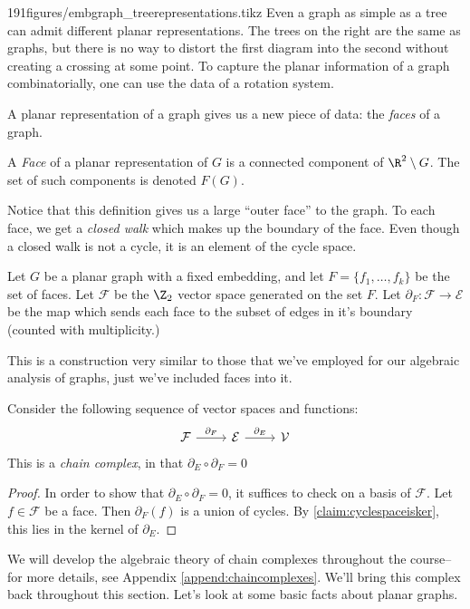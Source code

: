 \begin{examplefigureenv}{191figures/embgraph_treerepresentations.tikz}	Even a graph as simple as a tree can admit different planar representations. The trees on the right are the same as graphs, but there is no way to distort the first diagram into the second without creating a crossing at some point. To capture the planar information of a graph combinatorially, one can use the data of a rotation system.
\end{examplefigureenv}
A planar representation of a graph gives us a new piece of data: the \emph{faces} of a graph. 
\begin{definition} A \emph{Face} of a planar representation of $G$ is a connected component of $\R^2\setminus G$.  The set of such components is denoted $F(G)$. 
\end{definition}
 Notice that this definition gives us a large ``outer face'' to the graph. To each face, we get a \emph{closed walk} which makes up the boundary of the face. Even though a closed walk is not a cycle, it is an element of the cycle space. 
\begin{definition} Let $G$ be a planar graph with a fixed embedding, and let $F=\{f_1, \ldots, f_k\}$ be the set of faces. Let $\mathcal F$ be the $\Z_2$ vector space generated on the set $F$. Let $\partial_F: \mathcal F\to \mathcal E$ be the map which sends each face to the subset of edges in it's boundary (counted with multiplicity.) 
 \end{definition}
This is a construction very similar to those that we've employed for our algebraic analysis of graphs, just we've included faces into it. 
\begin{claim}
Consider the following sequence of vector spaces and functions:
\[ \begin{tikzcd}
\mathcal F \arrow{r}{\partial_F} & \mathcal E \arrow{r}{\partial_E} & \mathcal V
\end{tikzcd}\]
This is a \emph{chain complex}, in that $\partial_E\circ \partial_F =0$ \label{def:planarcomplex}
\label{claim:dsquarezerograph}
\end{claim}
\begin{proof}
In order to show that $\partial_E\circ \partial_F=0$, it suffices to check on a basis of $\mathcal F$. Let $f\in \mathcal F$ be a face. Then $\partial_F(f)$ is a union of cycles. By \ref{claim:cyclespaceisker}, this lies in the kernel of $\partial_E$. 
\end{proof}
We will develop the algebraic theory of chain complexes throughout the course-- for more details, see Appendix \ref{append:chaincomplexes}. 
We'll bring this complex back throughout this section.  Let's look at some basic facts about planar graphs.

